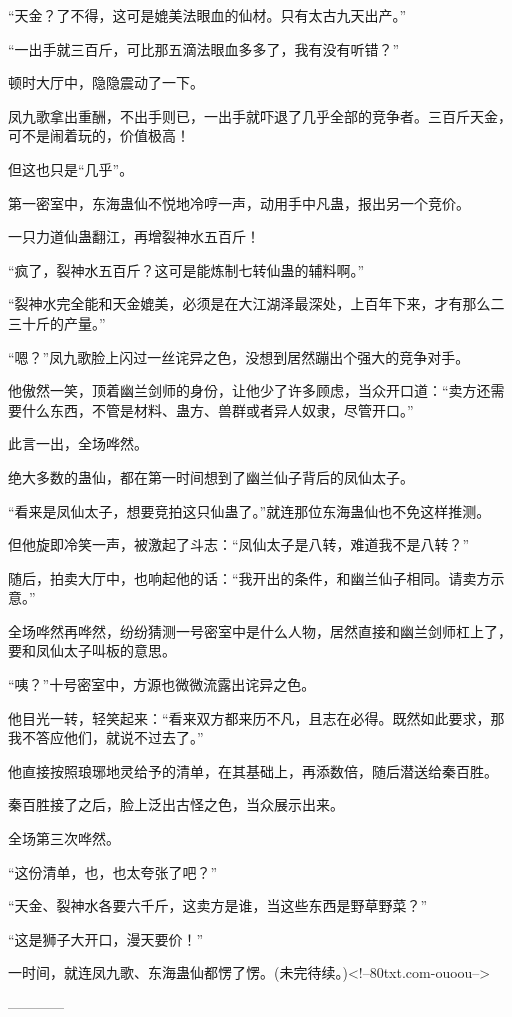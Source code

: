 \begin{this_body}
“天金？了不得，这可是媲美法眼血的仙材。只有太古九天出产。”

“一出手就三百斤，可比那五滴法眼血多多了，我有没有听错？”

顿时大厅中，隐隐震动了一下。

凤九歌拿出重酬，不出手则已，一出手就吓退了几乎全部的竞争者。三百斤天金，可不是闹着玩的，价值极高！

但这也只是“几乎”。

第一密室中，东海蛊仙不悦地冷哼一声，动用手中凡蛊，报出另一个竞价。

一只力道仙蛊翻江，再增裂神水五百斤！

“疯了，裂神水五百斤？这可是能炼制七转仙蛊的辅料啊。”

“裂神水完全能和天金媲美，必须是在大江湖泽最深处，上百年下来，才有那么二三十斤的产量。”

“嗯？”凤九歌脸上闪过一丝诧异之色，没想到居然蹦出个强大的竞争对手。

他傲然一笑，顶着幽兰剑师的身份，让他少了许多顾虑，当众开口道：“卖方还需要什么东西，不管是材料、蛊方、兽群或者异人奴隶，尽管开口。”

此言一出，全场哗然。

绝大多数的蛊仙，都在第一时间想到了幽兰仙子背后的凤仙太子。

“看来是凤仙太子，想要竞拍这只仙蛊了。”就连那位东海蛊仙也不免这样推测。

但他旋即冷笑一声，被激起了斗志：“凤仙太子是八转，难道我不是八转？”

随后，拍卖大厅中，也响起他的话：“我开出的条件，和幽兰仙子相同。请卖方示意。”

全场哗然再哗然，纷纷猜测一号密室中是什么人物，居然直接和幽兰剑师杠上了，要和凤仙太子叫板的意思。

“咦？”十号密室中，方源也微微流露出诧异之色。

他目光一转，轻笑起来：“看来双方都来历不凡，且志在必得。既然如此要求，那我不答应他们，就说不过去了。”

他直接按照琅琊地灵给予的清单，在其基础上，再添数倍，随后潜送给秦百胜。

秦百胜接了之后，脸上泛出古怪之色，当众展示出来。

全场第三次哗然。

“这份清单，也，也太夸张了吧？”

“天金、裂神水各要六千斤，这卖方是谁，当这些东西是野草野菜？”

“这是狮子大开口，漫天要价！”

一时间，就连凤九歌、东海蛊仙都愣了愣。(未完待续。)<!--80txt.com-ouoou-->

------------

\end{this_body}

